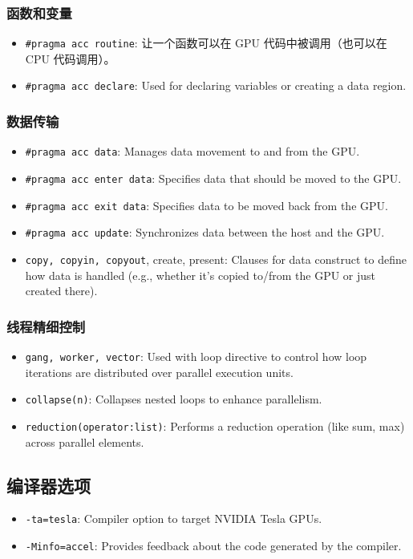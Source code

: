 \subsubsection{函数和变量}
\begin{itemize}
\item \verb`#pragma acc routine`: 让一个函数可以在 GPU 代码中被调用（也可以在 CPU 代码调用）。
\item \verb`#pragma acc declare`: Used for declaring variables or creating a data region.
\end{itemize}

\subsubsection{数据传输}
\begin{itemize}
\item \verb`#pragma acc data`: Manages data movement to and from the GPU.
\item \verb`#pragma acc enter data`: Specifies data that should be moved to the GPU.
\item \verb`#pragma acc exit data`: Specifies data to be moved back from the GPU.
\item \verb`#pragma acc update`: Synchronizes data between the host and the GPU.
\item \verb`copy, copyin, copyout`, create, present: Clauses for data construct to define how data is handled (e.g., whether it's copied to/from the GPU or just created there).
\end{itemize}

\subsubsection{线程精细控制}
\begin{itemize}
\item \verb`gang, worker, vector`: Used with loop directive to control how loop iterations are distributed over parallel execution units.
\item \verb`collapse(n)`: Collapses nested loops to enhance parallelism.
\item \verb`reduction(operator:list)`: Performs a reduction operation (like sum, max) across parallel elements.
\end{itemize}

\subsection{编译器选项}
\begin{itemize}
\item \verb`-ta=tesla`: Compiler option to target NVIDIA Tesla GPUs.
\item \verb`-Minfo=accel`: Provides feedback about the code generated by the compiler.
\end{itemize}
